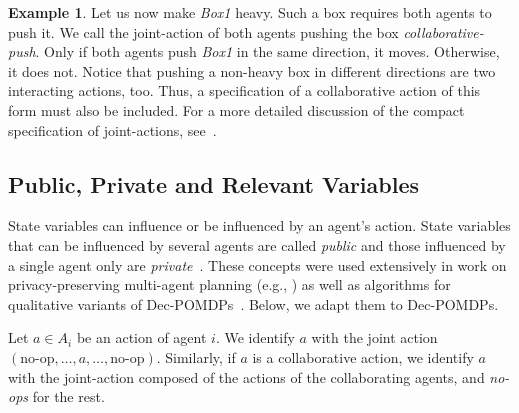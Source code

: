 \documentclass[letterpaper]{article}
\theoremstyle{definition}
\newtheorem{example}{Example}
\begin{document}
\begin{example}
Let us now make \emph{Box1} heavy. 
Such a box requires both agents to push it.
We call the joint-action of both agents pushing the box 
\emph{collaborative-push}. Only if both agents push \emph{Box1} in the same direction, it moves. Otherwise, it does not.
Notice that pushing a non-heavy box in different directions are two interacting actions, too. Thus, a specification of a collaborative action of this form must also be included.
For a more detailed discussion of the compact specification of joint-actions, see~\cite{INTERPRIVATE}. 
\end{example}


\subsection{Public, Private and Relevant Variables}
State variables can influence or be influenced by an agent's action. State variables that can be influenced by several agents are called {\em public} and those influenced by a single agent only are {\em private}~\cite{FACTOREDPLAN}.
These concepts were used extensively
in work on privacy-preserving multi-agent planning
(e.g., \cite{NB14,MaliahBS17}) as well as
algorithms for qualitative variants of Dec-POMDPs~\cite{QDECPOMDPPLAN1,QDECPOMDPPLAN2}.
Below, we adapt them to Dec-POMDPs.

Let $a\in A_i$ be an action of agent $i$. We identify $a$ with the joint action $(\mbox{no-op},\ldots, a,\ldots,\mbox{no-op})$. Similarly, if $a$ is a collaborative action, we identify $a$ with the joint-action composed of the actions of the collaborating agents, and {\em no-ops} for the rest.
\end{document}
